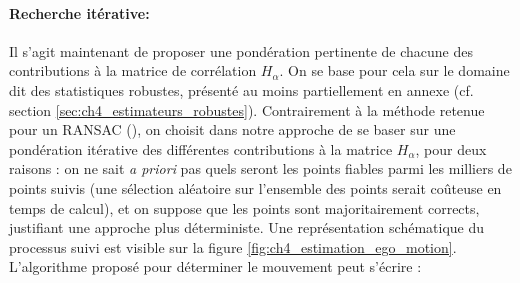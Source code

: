 \paragraph{Recherche itérative:\\} \label{sec:ch4_iterative_ego_motion}
Il s'agit maintenant de proposer une pondération pertinente de chacune des contributions à la matrice de corrélation $H_\alpha$. On se base pour cela sur le domaine dit des \og statistiques robustes\fg{}, présenté au moins partiellement en annexe (cf. section \ref{sec:ch4_estimateurs_robustes}). Contrairement à la méthode retenue pour un RANSAC (\cite{Fischler1981}), on choisit dans notre approche de se baser sur une pondération itérative des différentes contributions à la matrice $H_\alpha$, pour deux raisons : on ne sait \textit{a priori} pas quels seront les points fiables parmi les milliers de points suivis (une sélection aléatoire sur l'ensemble des points serait coûteuse en temps de calcul), et on suppose que les points sont majoritairement corrects, justifiant une approche plus déterministe. Une représentation schématique du processus suivi est visible sur la figure \ref{fig:ch4_estimation_ego_motion}. L'algorithme proposé pour déterminer le mouvement peut s'écrire :

